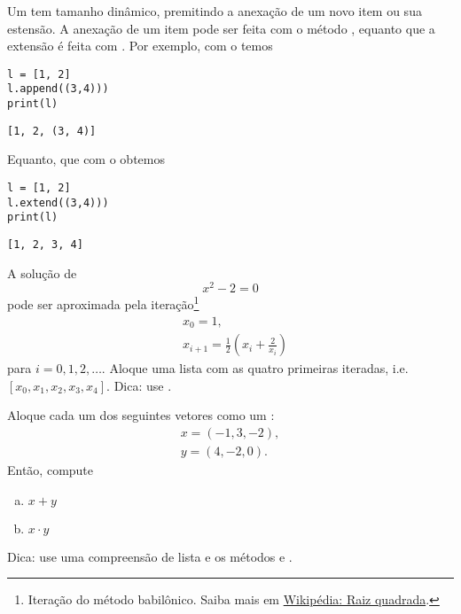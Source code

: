\documentclass[12pt]{article}
\begin{document}
\begin{obs}
  Um {\PYTHONlist} tem tamanho dinâmico, premitindo a anexação de um novo item ou sua estensão. A anexação de um item pode ser feita com o método {\PYTHONlistDOTappend}, equanto que a extensão é feita com {\PYTHONlistDOTextend}. Por exemplo, com o {\PYTHONlistDOTappend} temos

\begin{lstlisting}
l = [1, 2]
l.append((3,4)))
print(l)
\end{lstlisting}

\begin{verbatim}
[1, 2, (3, 4)]
\end{verbatim}

Equanto, que com o {\PYTHONlistDOTextend} obtemos

\begin{lstlisting}
l = [1, 2]
l.extend((3,4)))
print(l)
\end{lstlisting}
  
\begin{verbatim}
[1, 2, 3, 4]
\end{verbatim}
  
\end{obs}

\begin{exr}
  A solução de
  \begin{equation}
    x^2 - 2 = 0
  \end{equation}
  pode ser aproximada pela iteração\footnote{Iteração do método babilônico. Saiba mais em \href{https://pt.wikipedia.org/wiki/Raiz_quadrada\#M\%C3\%A9todo_babil\%C3\%B4nico}{Wikipédia: Raiz quadrada}.}
  \begin{align}
    &x_0 = 1,\\
    &x_{i+1} = \frac{1}{2}\left(x_{i} + \frac{2}{x_i}\right)
  \end{align}
  para $i = 0, 1, 2, \ldots$. Aloque uma lista com as quatro primeiras iteradas, i.e. $[x_0, x_1, x_2, x_3, x_4]$. Dica: use {\PYTHONlistDOTappend}.
\end{exr}

\begin{exr}
  Aloque cada um dos seguintes vetores como um {\PYTHONlist}:
  \begin{align}
    x = (-1, 3, -2),\\
    y = (4, -2, 0).
  \end{align}
  Então, compute
  \begin{enumerate}[a)]
  \item $x+y$
  \item $x\cdot y$
  \end{enumerate}
  Dica: use uma compreensão de lista e os métodos {\PYTHONzip} e {\PYTHONsum}.
\end{exr}
\end{document}
